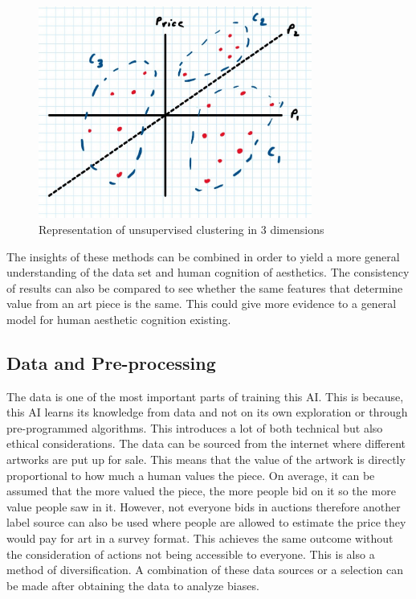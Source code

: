 \documentclass{article}
\begin{document}
\begin{figure}[htp]
    \centering
    \includegraphics[width=9cm]{KMeans.jpg}
    \caption{Representation of unsupervised clustering in 3 dimensions}
    \label{fig:kMeans}
\end{figure}

The insights of these methods can be combined in order to yield a more general understanding of the data set and human cognition of aesthetics. The consistency of results can also be compared to see whether the same features that determine value from an art piece is the same. This could give more evidence to a general model for human aesthetic cognition existing. 

\subsection{Data and Pre-processing}

The data is one of the most important parts of training this AI. This is because, this AI learns its knowledge from data and not on its own exploration or through pre-programmed algorithms. This introduces a lot of both technical but also ethical considerations. The data can be sourced from the internet where different artworks are put up for sale. This means that the value of the artwork is directly proportional to how much a human values the piece. On average, it can be assumed that the more valued the piece, the more people bid on it so the more value people saw in it. However, not everyone bids in auctions therefore another label source can also be used where people are allowed to estimate the price they would pay for art in a survey format. This achieves the same outcome without the consideration of actions not being accessible to everyone. This is also a method of diversification. A combination of these data sources or a selection can be made after obtaining the data to analyze biases.
\end{document}
